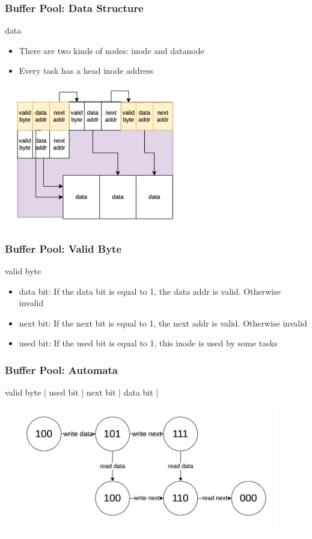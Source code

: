 \documentclass[notheorems, aspectratio=54]{beamer}
\begin{document}
\begin{frame}
    \frametitle{Buffer Pool: Data Structure}
    \begin{block} {data}
        \begin{itemize}
            \item There are two kinds of nodes: inode and datanode
            \item Every task has a head inode address
        \end{itemize}
    \end{block}
    \centering
    \includegraphics[width=8cm]{global_img_dir/linklist.png}
\end{frame}

\begin{frame}
    \frametitle{Buffer Pool: Valid Byte}
    \begin{block} {valid byte}
        \begin{itemize}
            \item data bit: If the data bit is equal to 1, the data addr is valid. Otherwise invalid
            \item next bit: If the next bit is equal to 1, the next addr is valid. Otherwise invalid
            \item used bit: If the used bit is equal to 1, this inode is used by some tasks
        \end{itemize}
    \end{block}
\end{frame}

\begin{frame}
    \frametitle{Buffer Pool: Automata}
    \begin{block} {valid byte}
        | used bit | next bit | data bit |
    \end{block}
    \centering
    \includegraphics[width=12cm]{global_img_dir/automata.png}
\end{frame}
\end{document}
